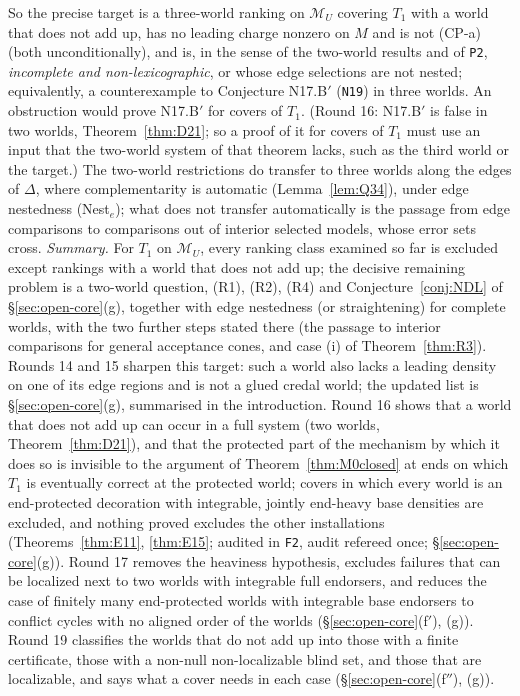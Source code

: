 \documentclass[11pt]{article}
\theoremstyle{definition}
\theoremstyle{remark}
\newcommand{\M}{\mathcal M}
\newcommand{\src}[1]{\texttt{#1}}
\begin{document}
So the precise target is a three-world ranking on $\M_U$ covering $T_1$ with a world that does not add up, has no leading charge nonzero on $M$ and is not (CP-a) (both unconditionally), and is, in the sense of the two-world results and of \src{P2}, \emph{incomplete and non-lexicographic}, or whose edge selections are not nested; equivalently, a counterexample to Conjecture N17.B$'$ (\src{N19}) in three worlds. An obstruction would prove N17.B$'$ for covers of $T_1$. (Round 16: N17.B$'$ is false in two worlds, Theorem~\ref{thm:D21}; so a proof of it for covers of $T_1$ must use an input that the two-world system of that theorem lacks, such as the third world or the target.) The two-world restrictions do transfer to three worlds along the edges of $\Delta$, where complementarity is automatic (Lemma~\ref{lem:Q34}), under edge nestedness (Nest$_e$); what does not transfer automatically is the passage from edge comparisons to comparisons out of interior selected models, whose error sets cross. \emph{Summary.} For $T_1$ on $\M_U$, every ranking class examined so far is excluded except rankings with a world that does not add up; the decisive remaining problem is a two-world question, (R1), (R2), (R4) and Conjecture~\ref{conj:NDL} of \S\ref{sec:open-core}(g), together with edge nestedness (or straightening) for complete worlds, with the two further steps stated there (the passage to interior comparisons for general acceptance cones, and case (i) of Theorem~\ref{thm:R3}). Rounds 14 and 15 sharpen this target: such a world also lacks a leading density on one of its edge regions and is not a glued credal world; the updated list is \S\ref{sec:open-core}(g), summarised in the introduction. Round 16 shows that a world that does not add up can occur in a full system (two worlds, Theorem~\ref{thm:D21}), and that the protected part of the mechanism by which it does so is invisible to the argument of Theorem~\ref{thm:M0closed} at ends on which $T_1$ is eventually correct at the protected world; covers in which every world is an end-protected decoration with integrable, jointly end-heavy base densities are excluded, and nothing proved excludes the other installations (Theorems~\ref{thm:E11}, \ref{thm:E15}; audited in \src{F2}, audit refereed once; \S\ref{sec:open-core}(g)). Round 17 removes the heaviness hypothesis, excludes failures that can be localized next to two worlds with integrable full endorsers, and reduces the case of finitely many end-protected worlds with integrable base endorsers to conflict cycles with no aligned order of the worlds (\S\ref{sec:open-core}(f$'$), (g)). Round 19 classifies the worlds that do not add up into those with a finite certificate, those with a non-null non-localizable blind set, and those that are localizable, and says what a cover needs in each case (\S\ref{sec:open-core}(f$''$), (g)).
\end{document}
